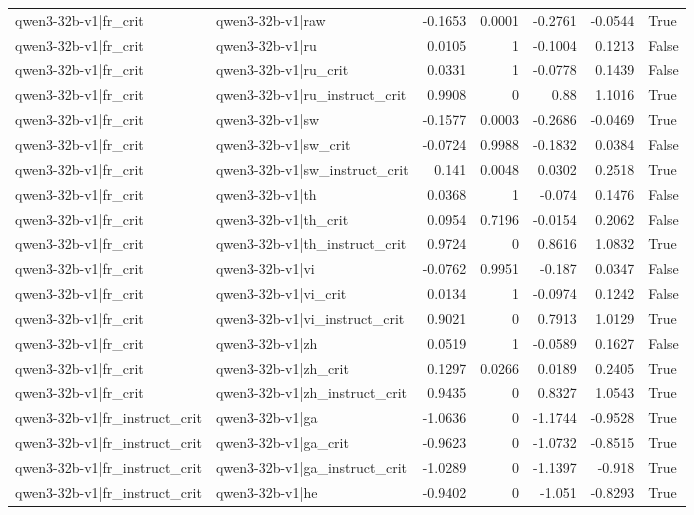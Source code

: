 \begin{table}
\begin{tabular}{l l r r r r l}
qwen3-32b-v1|fr_crit & qwen3-32b-v1|raw & -0.1653 & 0.0001 & -0.2761 & -0.0544 & True \\
qwen3-32b-v1|fr_crit & qwen3-32b-v1|ru & 0.0105 & 1 & -0.1004 & 0.1213 & False \\
qwen3-32b-v1|fr_crit & qwen3-32b-v1|ru_crit & 0.0331 & 1 & -0.0778 & 0.1439 & False \\
qwen3-32b-v1|fr_crit & qwen3-32b-v1|ru_instruct_crit & 0.9908 & 0 & 0.88 & 1.1016 & True \\
qwen3-32b-v1|fr_crit & qwen3-32b-v1|sw & -0.1577 & 0.0003 & -0.2686 & -0.0469 & True \\
qwen3-32b-v1|fr_crit & qwen3-32b-v1|sw_crit & -0.0724 & 0.9988 & -0.1832 & 0.0384 & False \\
qwen3-32b-v1|fr_crit & qwen3-32b-v1|sw_instruct_crit & 0.141 & 0.0048 & 0.0302 & 0.2518 & True \\
qwen3-32b-v1|fr_crit & qwen3-32b-v1|th & 0.0368 & 1 & -0.074 & 0.1476 & False \\
qwen3-32b-v1|fr_crit & qwen3-32b-v1|th_crit & 0.0954 & 0.7196 & -0.0154 & 0.2062 & False \\
qwen3-32b-v1|fr_crit & qwen3-32b-v1|th_instruct_crit & 0.9724 & 0 & 0.8616 & 1.0832 & True \\
qwen3-32b-v1|fr_crit & qwen3-32b-v1|vi & -0.0762 & 0.9951 & -0.187 & 0.0347 & False \\
qwen3-32b-v1|fr_crit & qwen3-32b-v1|vi_crit & 0.0134 & 1 & -0.0974 & 0.1242 & False \\
qwen3-32b-v1|fr_crit & qwen3-32b-v1|vi_instruct_crit & 0.9021 & 0 & 0.7913 & 1.0129 & True \\
qwen3-32b-v1|fr_crit & qwen3-32b-v1|zh & 0.0519 & 1 & -0.0589 & 0.1627 & False \\
qwen3-32b-v1|fr_crit & qwen3-32b-v1|zh_crit & 0.1297 & 0.0266 & 0.0189 & 0.2405 & True \\
qwen3-32b-v1|fr_crit & qwen3-32b-v1|zh_instruct_crit & 0.9435 & 0 & 0.8327 & 1.0543 & True \\
qwen3-32b-v1|fr_instruct_crit & qwen3-32b-v1|ga & -1.0636 & 0 & -1.1744 & -0.9528 & True \\
qwen3-32b-v1|fr_instruct_crit & qwen3-32b-v1|ga_crit & -0.9623 & 0 & -1.0732 & -0.8515 & True \\
qwen3-32b-v1|fr_instruct_crit & qwen3-32b-v1|ga_instruct_crit & -1.0289 & 0 & -1.1397 & -0.918 & True \\
qwen3-32b-v1|fr_instruct_crit & qwen3-32b-v1|he & -0.9402 & 0 & -1.051 & -0.8293 & True \\

\end{tabular}
\end{table}
